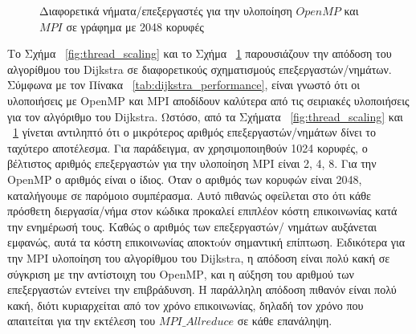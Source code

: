 \documentclass[12pt,a4paper]{article}
\begin{document}
\vspace{0.3cm}


\begin{figure}[H]
\centering
{}
\caption{Διαφορετικά νήματα/επεξεργαστές για την υλοποίηση $OpenMP$ και $MPI$ σε γράφημα με 2048 κορυφές}
\label{fig:thread_scaling2}
\end{figure}


Το Σχήμα ~\ref{fig:thread_scaling} και το Σχήμα ~\ref{fig:thread_scaling2} παρουσιάζουν την απόδοση του αλγορίθμου του \foreignlanguage{english}{Dijkstra} σε διαφορετικούς σχηματισμούς επεξεργαστών/νημάτων. Σύμφωνα με τον Πίνακα ~\ref{tab:dijkstra_performance}, είναι γνωστό ότι οι υλοποιήσεις με \foreignlanguage{english}{OpenMP} και \foreignlanguage{english}{MPI} αποδίδουν καλύτερα από τις σειριακές υλοποιήσεις για τον αλγόριθμο του \foreignlanguage{english}{Dijkstra}. Ωστόσο, από τα Σχήματα ~\ref{fig:thread_scaling} και ~\ref{fig:thread_scaling2} γίνεται αντιληπτό ότι ο μικρότερος αριθμός επεξεργαστών/νημάτων δίνει το ταχύτερο αποτέλεσμα. Για παράδειγμα, αν χρησιμοποιηθούν 1024 κορυφές, ο βέλτιστος αριθμός επεξεργαστών για την υλοποίηση \foreignlanguage{english}{MPI} είναι 2, 4, 8. Για την  \foreignlanguage{english}{OpenMP} ο αριθμός είναι ο ίδιος. Όταν ο αριθμός των κορυφών είναι 2048, καταλήγουμε σε παρόμοιο συμπέρασμα. Αυτό πιθανώς οφείλεται στο ότι κάθε πρόσθετη διεργασία/νήμα στον κώδικα προκαλεί επιπλέον κόστη επικοινωνίας κατά την ενημέρωσή τους. Καθώς ο αριθμός των επεξεργαστών/ νημάτων αυξάνεται εμφανώς, αυτά τα κόστη επικοινωνίας αποκτoύν σημαντική επίπτωση. Ειδικότερα για την \foreignlanguage{english}{MPI} υλοποίηση του αλγορίθμου του \foreignlanguage{english}{Dijkstra}, η απόδοση είναι πολύ κακή σε σύγκριση με την αντίστοιχη του \foreignlanguage{english}{OpenMP}, και η αύξηση του αριθμού των επεξεργαστών εντείνει την επιβράδυνση. Η παράλληλη απόδοση πιθανόν είναι πολύ κακή, διότι κυριαρχείται από τον χρόνο επικοινωνίας, δηλαδή τον χρόνο που απαιτείται για την εκτέλεση του $MPI\_Allreduce$ σε κάθε επανάληψη.
\end{document}
